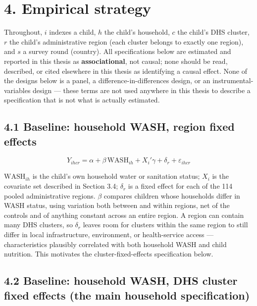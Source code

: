 \section*{4. Empirical strategy}

Throughout, $i$ indexes a child, $h$ the child's household, $c$ the child's DHS cluster, $r$ the child's administrative region (each cluster belongs to exactly one region), and $s$ a survey round (country). All specifications below are estimated and reported in this thesis as \textbf{associational}, not causal; none should be read, described, or cited elsewhere in this thesis as identifying a causal effect. None of the designs below is a panel, a difference-in-differences design, or an instrumental-variables design --- these terms are not used anywhere in this thesis to describe a specification that is not what is actually estimated.

\subsection*{4.1 Baseline: household WASH, region fixed effects}

$$Y_{ihcr} = \alpha + \beta\,\text{WASH}_{ih} + X_i'\gamma + \delta_r + \varepsilon_{ihcr}$$

$\text{WASH}_{ih}$ is the child's own household water or sanitation status; $X_i$ is the covariate set described in Section 3.4; $\delta_r$ is a fixed effect for each of the 114 pooled administrative regions. $\beta$ compares children whose households differ in WASH status, using variation both between and within regions, net of the controls and of anything constant across an entire region. A region can contain many DHS clusters, so $\delta_r$ leaves room for clusters within the same region to still differ in local infrastructure, environment, or health-service access --- characteristics plausibly correlated with both household WASH and child nutrition. This motivates the cluster-fixed-effects specification below.

\subsection*{4.2 Baseline: household WASH, DHS cluster fixed effects (the main household specification)}

